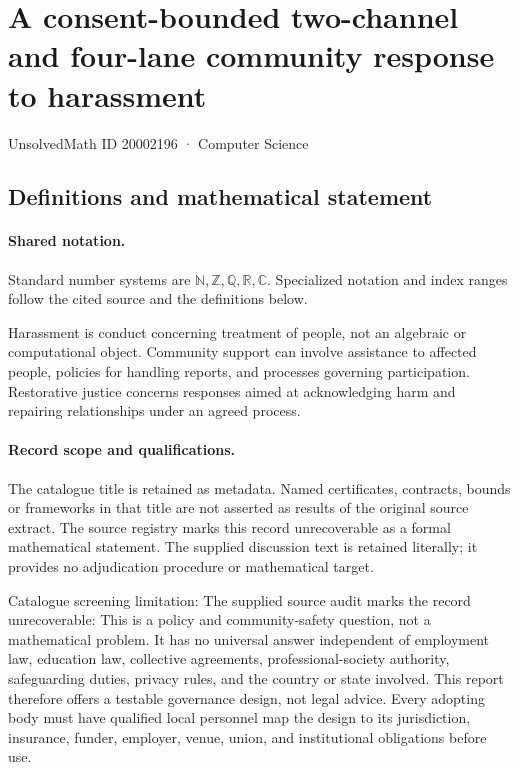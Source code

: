 \documentclass[11pt]{article}
\begin{document}
\setcounter{section}{20002195}
\section{A consent-bounded two-channel and four-lane community response to harassment}\label{20002196}
{\small\sffamily UnsolvedMath ID 20002196 · Computer Science}
\subsection{Definitions and mathematical statement}

\paragraph{Shared notation.}Standard number systems are $\mathbb N,\mathbb Z,\mathbb Q,\mathbb R,\mathbb C$. Specialized notation and index ranges follow the cited source and the definitions below.


Harassment is conduct concerning treatment of people, not an algebraic or computational object. Community support can involve assistance to affected people, policies for handling reports, and processes governing participation. Restorative justice concerns responses aimed at acknowledging harm and repairing relationships under an agreed process.
\paragraph{Record scope and qualifications.}
The catalogue title is retained as metadata. Named certificates, contracts, bounds or frameworks in that title are not asserted as results of the original source extract.
The source registry marks this record unrecoverable as a formal mathematical statement. The supplied discussion text is retained literally; it provides no adjudication procedure or mathematical target.

Catalogue screening limitation: The supplied source audit marks the record unrecoverable: This is a policy and community-safety question, not a mathematical problem. It has no universal answer independent of employment law, education law, collective agreements, professional-society authority, safeguarding duties, privacy rules, and the country or state involved. This report therefore offers a testable governance design, not legal advice. Every adopting body must have qualified local personnel map the design to its jurisdiction, insurance, funder, employer, venue, union, and institutional obligations before use.
\end{document}
